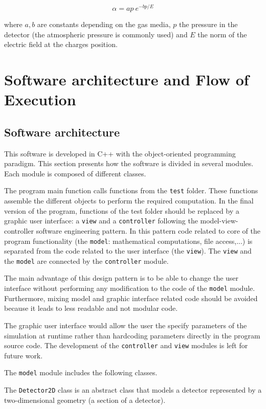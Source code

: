 \documentclass[11pt]{article}
\begin{document}
\[\alpha = ap \ e^{-bp/E}\]

where $a, b$ are constants depending on the gas media, $p$ the pressure in
the detector (the atmospheric pressure is commonly used) and $E$ the norm
of the electric field at the charges position.

\section{Software architecture and Flow of Execution}

\subsection{Software architecture}

This software is developed in C++ with the object-oriented programming paradigm.
This section presents how the software is divided in several modules. Each module
is composed of different classes.

The program main function calls functions from the \texttt{test} folder. These functions
assemble the different objects to perform the required computation. In the
final version of the program, functions of the test folder should be replaced
by a graphic user interface: a \texttt{view} and a \texttt{controller} following
the model-view-controller software engineering pattern. In this pattern code
related to core of the program functionality (the \texttt{model}: mathematical computations, file access,...)
is separated from the code related to the user interface (the \texttt{view}).
The \texttt{view} and the
\texttt{model} are connected by the \texttt{controller} module.

The main advantage of this design pattern is to be able to change the user interface without
performing any modification to the code of the \texttt{model} module. Furthermore,
mixing model and graphic interface related code should be avoided because it leads to
less readable and not modular code.

The graphic user interface would allow the user the specify
parameters of the simulation at runtime rather than hardcoding parameters
directly in the program source code.
The development of the \texttt{controller} and \texttt{view} modules
is left for future work.

The \texttt{model} module includes the following classes.

The \texttt{Detector2D} class is an abstract class that models a detector
represented by a two-dimensional geometry (a section of a detector).
\end{document}
